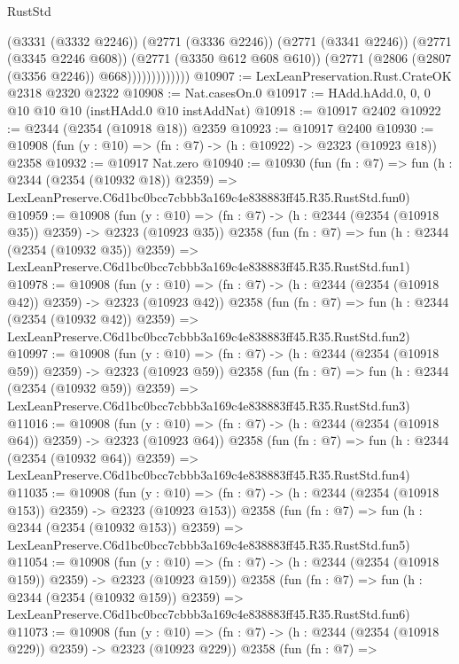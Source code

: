 \begin{lexlean}{RustStd}
\begin{coremodule}
                          (@3331 (@3332 @2246))
                          (@2771 (@3336 @2246))
                          (@2771 (@3341 @2246))
                          (@2771 (@3345 @2246 @608))
                          (@2771 (@3350 @612 @608 @610))
                          (@2771 (@2806 (@2807 (@3356 @2246)) @668)))))))))))))
@10907 := LexLeanPreservation.Rust.CrateOK @2318 @2320 @2322
@10908 := Nat.casesOn.{0}
@10917 := HAdd.hAdd.{0, 0, 0} @10 @10 @10 (instHAdd.{0} @10 instAddNat)
@10918 := @10917 @2402
@10922 := @2344 (@2354 (@10918 @18)) @2359
@10923 := @10917 @2400
@10930 := @10908 (fun (y : @10) => (fn : @7) -> (h : @10922) -> @2323 (@10923 @18)) @2358
@10932 := @10917 Nat.zero
@10940 := @10930
    (fun (fn : @7) =>
    fun (h : @2344 (@2354 (@10932 @18)) @2359) =>
    LexLeanPreserve.C6d1bc0bcc7cbbb3a169c4e838883ff45.R35.RustStd.fun0)
@10959 := @10908
    (fun (y : @10) => (fn : @7) -> (h : @2344 (@2354 (@10918 @35)) @2359) -> @2323 (@10923 @35))
    @2358
    (fun (fn : @7) =>
    fun (h : @2344 (@2354 (@10932 @35)) @2359) =>
    LexLeanPreserve.C6d1bc0bcc7cbbb3a169c4e838883ff45.R35.RustStd.fun1)
@10978 := @10908
    (fun (y : @10) => (fn : @7) -> (h : @2344 (@2354 (@10918 @42)) @2359) -> @2323 (@10923 @42))
    @2358
    (fun (fn : @7) =>
    fun (h : @2344 (@2354 (@10932 @42)) @2359) =>
    LexLeanPreserve.C6d1bc0bcc7cbbb3a169c4e838883ff45.R35.RustStd.fun2)
@10997 := @10908
    (fun (y : @10) => (fn : @7) -> (h : @2344 (@2354 (@10918 @59)) @2359) -> @2323 (@10923 @59))
    @2358
    (fun (fn : @7) =>
    fun (h : @2344 (@2354 (@10932 @59)) @2359) =>
    LexLeanPreserve.C6d1bc0bcc7cbbb3a169c4e838883ff45.R35.RustStd.fun3)
@11016 := @10908
    (fun (y : @10) => (fn : @7) -> (h : @2344 (@2354 (@10918 @64)) @2359) -> @2323 (@10923 @64))
    @2358
    (fun (fn : @7) =>
    fun (h : @2344 (@2354 (@10932 @64)) @2359) =>
    LexLeanPreserve.C6d1bc0bcc7cbbb3a169c4e838883ff45.R35.RustStd.fun4)
@11035 := @10908
    (fun (y : @10) => (fn : @7) -> (h : @2344 (@2354 (@10918 @153)) @2359) -> @2323 (@10923 @153))
    @2358
    (fun (fn : @7) =>
    fun (h : @2344 (@2354 (@10932 @153)) @2359) =>
    LexLeanPreserve.C6d1bc0bcc7cbbb3a169c4e838883ff45.R35.RustStd.fun5)
@11054 := @10908
    (fun (y : @10) => (fn : @7) -> (h : @2344 (@2354 (@10918 @159)) @2359) -> @2323 (@10923 @159))
    @2358
    (fun (fn : @7) =>
    fun (h : @2344 (@2354 (@10932 @159)) @2359) =>
    LexLeanPreserve.C6d1bc0bcc7cbbb3a169c4e838883ff45.R35.RustStd.fun6)
@11073 := @10908
    (fun (y : @10) => (fn : @7) -> (h : @2344 (@2354 (@10918 @229)) @2359) -> @2323 (@10923 @229))
    @2358
    (fun (fn : @7) =>

\end{coremodule}
\end{lexlean}
